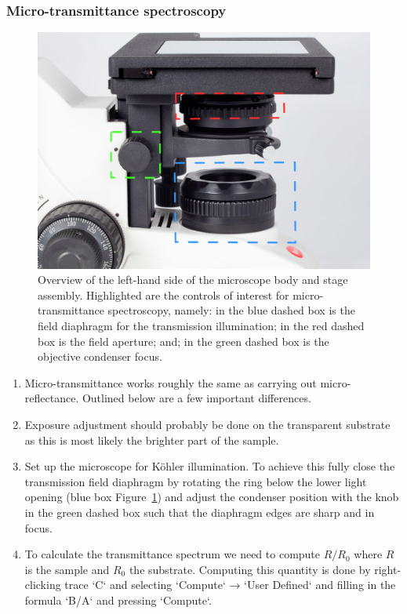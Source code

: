 \documentclass[a4paper]{scrartcl}
\begin{document}
\subsubsection*{Micro-transmittance spectroscopy}
\begin{figure}[h]
	\begin{center}
		\includegraphics[width=0.5\linewidth, keepaspectratio]{figures/kohler.png}
	\end{center}
	\caption{Overview of the left-hand side of the microscope body and stage assembly. Highlighted are the controls of interest for micro-transmittance spectroscopy, namely: in the blue dashed box is the field diaphragm for the transmission illumination; in the red dashed box is the field aperture; and; in the green dashed box is the objective condenser focus.}
	\label{fig:kohler}
\end{figure}

\begin{enumerate}
	\item Micro-transmittance works roughly the same as carrying out micro-reflectance. Outlined below are a few important differences.
	\item Exposure adjustment should probably be done on the transparent substrate as this is most likely the brighter part of the sample.
	\item Set up the microscope for Köhler illumination. To achieve this fully close the transmission field diaphragm by rotating the ring below the lower light opening (blue box Figure~\ref{fig:kohler}) and adjust the condenser position with the knob in the green dashed box such that the diaphragm edges are sharp and in focus.
	\item To calculate the transmittance spectrum we need to compute $R/R_0$ where $R$ is the sample and $R_0$ the substrate. Computing this quantity is done by right-clicking trace `C` and selecting `Compute` → `User Defined` and filling in the formula `B/A` and pressing `Compute`.
\end{enumerate}
\end{document}
